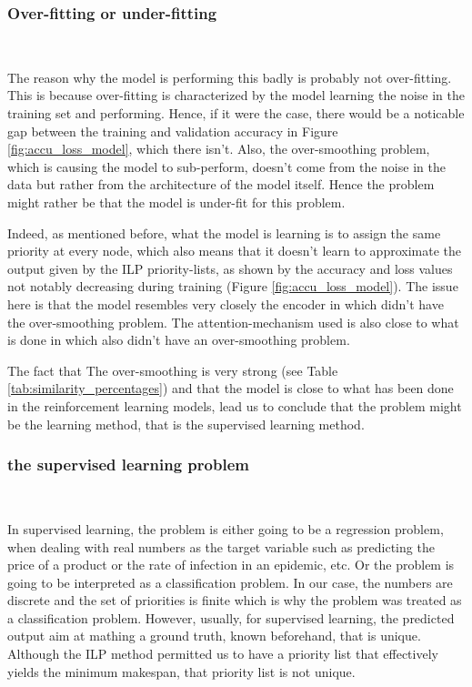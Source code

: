 \subsubsection{Over-fitting or under-fitting}
~

The reason why the model is performing this badly is probably
not over-fitting.
This is because over-fitting is characterized
by the model learning the noise in the training set and performing\cite{jabbar2015overfitting_underfitting}.
Hence, if it were the case, there would be a noticable gap
between the training and validation accuracy in Figure \ref{fig:accu_loss_model},
which there isn't.
Also, the over-smoothing problem, which is causing the model to sub-perform,
 doesn't come from the noise
in the data but rather from the architecture of the model itself\cite{chen2020oversmoothing}.
Hence the problem might rather be that the model is under-fit for this problem.

Indeed, as mentioned before, what the model is learning is 
to assign the same priority at every node, which also means
that it doesn't learn to approximate the output given by the ILP priority-lists,
as shown by the accuracy and loss values not notably decreasing during
training (Figure \ref{fig:accu_loss_model}).
The issue here is that the model resembles very closely the 
encoder in \citet{Lee2021GlobalDagSchedDRL} which didn't 
have the over-smoothing problem.
The attention-mechanism used is also close to what is done in \citet{Zhao2024GATDRLmodel}
which also didn't have an over-smoothing problem.

The fact that The over-smoothing is very strong (see Table \ref{tab:similarity_percentages})
and that the model is close to what has been done in the reinforcement learning models\cite{Lee2021GlobalDagSchedDRL}\cite{Zhao2024GATDRLmodel},
lead us to conclude that the problem might be the learning method, 
that is the supervised learning method.

\subsubsection{the supervised learning problem}
~

In supervised learning, the problem is either going to be a
regression problem, when dealing with real numbers as the target variable
such as predicting the price of a product or the rate of infection in an epidemic, etc.
Or the problem is going to be interpreted as a classification problem.
In our case, the numbers are discrete and the set of priorities is finite
which is why the problem was treated as a classification problem.
However, usually, for supervised learning, the predicted output 
aim at mathing a ground truth, known beforehand, that is unique.
Although the ILP method permitted us to have a priority list that
effectively yields the minimum makespan,
that priority list is not unique.

